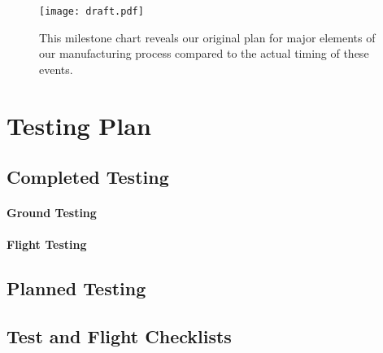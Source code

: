 \documentclass[report]{byu-aero}
\begin{document}
\begin{figure}[h!]
	\centering
	\texttt{[image: draft.pdf]}
	\caption{This milestone chart reveals our original plan for major elements of our manufacturing process compared to the actual timing of these events.}
	\label{fig:plannedvsactualtimingmanufacturing}
\end{figure}



\section{Testing Plan} %
\label{sec:TestingPlan}


\subsection{Completed Testing}
\label{ssec:completedtesting}




\paragraph{Ground Testing}
\label{sssec:groundtesting}



\paragraph{Flight Testing}
\label{sssec:flighttesting}



\subsection{Planned Testing}
\label{ssec:plannedtesting}



\subsection{Test and Flight Checklists}
\end{document}

